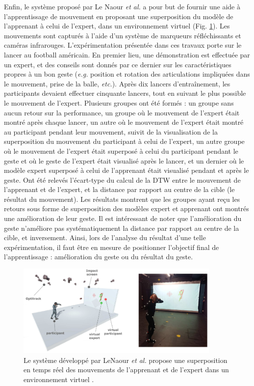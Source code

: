 Enfin, le système proposé par Le Naour \textit{et al.} a pour but de fournir une aide à l'apprentissage de mouvement en proposant une superposition du modèle de l'apprenant à celui de l'expert, dans un environnement virtuel \parencite{LeNaour2019S3V} (Fig. \ref{fig:LeNaour_eiah}). Les mouvements sont capturés à l'aide d'un système de marqueurs réfléchissants et caméras infrarouges. L'expérimentation présentée dans ces travaux porte sur le lancer au football américain. En premier lieu, une démonstration est effectuée par un expert, et des conseils sont donnés par ce dernier sur les caractéristiques propres à un bon geste (\textit{e.g.} position et rotation des articulations impliquées dans le mouvement, prise de la balle, \textit{etc.}). Après dix lancers d'entraînement, les participants devaient effectuer cinquante lancers, tout en suivant le plus possible le mouvement de l'expert. Plusieurs groupes ont été formés : un groupe sans aucun retour sur la performance, un groupe où le mouvement de l'expert était montré après chaque lancer, un autre où le mouvement de l'expert était montré au participant pendant leur mouvement, suivit de la visualisation de la superposition du mouvement du participant à celui de l'expert, un autre groupe où le mouvement de l'expert était superposé à celui du participant pendant le geste et où le geste de l'expert était visualisé après le lancer, et un dernier où le modèle expert superposé à celui de l'apprenant était visualisé pendant et après le geste. Ont été relevés l'écart-type du calcul de la DTW entre le mouvement de l'apprenant et de l'expert, et la distance par rapport au centre de la cible (le résultat du mouvement). Les résultats montrent que les groupes ayant reçu les retours sous forme de superposition des modèles expert et apprenant ont montrés une amélioration de leur geste. Il est intéressant de noter que l'amélioration du geste n'améliore pas systématiquement la distance par rapport au centre de la cible, et inversement. Ainsi, lors de l'analyse du résultat d'une telle expérimentation, il faut être en mesure de positionner l'objectif final de l'apprentissage : amélioration du geste ou du résultat du geste.

\begin{figure}[h]
    \centering
    \includegraphics[width=10cm]{pictures/LeNaour_eiah.png}
    \caption[EVAH superposant les gestes de l'apprenant à ceux de l'expert \parencite{LeNaour2019S3V}]{Le système développé par LeNaour \textit{et al.} propose une superposition en temps réel des mouvements de l'apprenant et de l'expert dans un environnement virtuel \parencite{LeNaour2019S3V}.}
    \label{fig:LeNaour_eiah}
\end{figure}

